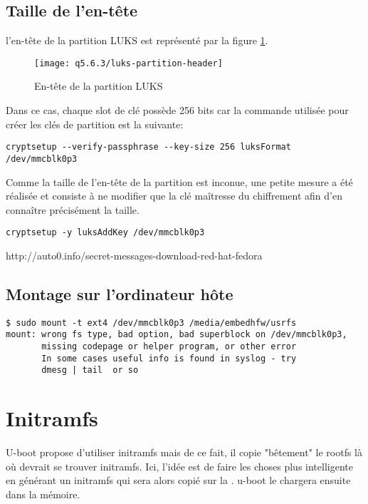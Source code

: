 \subsection{Taille de l'en-tête}
l'en-tête de la partition LUKS est représenté par la figure \ref{fig:luks partition header}.
\begin{figure}
	\centering
	\texttt{[image: q5.6.3/luks-partition-header]}
	\caption{\label{fig:luks partition header}En-tête de la partition LUKS}
\end{figure}
Dans ce cas, chaque slot de clé possède 256 bits car la commande utilisée pour créer les clés de partition est la suivante:
\begin{lstlisting}
cryptsetup --verify-passphrase --key-size 256 luksFormat /dev/mmcblk0p3
\end{lstlisting}

Comme la taille de l'en-tête de la partition est inconue, une petite mesure a été réalisée et consiste à ne modifier que la clé maîtresse du chiffrement afin d'en connaître précisément la taille.
\begin{lstlisting}
cryptsetup -y luksAddKey /dev/mmcblk0p3
\end{lstlisting}
http://auto0.info/secret-messages-download-red-hat-fedora

\subsection{Montage sur l'ordinateur hôte}
\begin{lstlisting}
$ sudo mount -t ext4 /dev/mmcblk0p3 /media/embedhfw/usrfs
mount: wrong fs type, bad option, bad superblock on /dev/mmcblk0p3,
       missing codepage or helper program, or other error
       In some cases useful info is found in syslog - try
       dmesg | tail  or so

\end{lstlisting}

\section{Initramfs}
U-boot propose d'utiliser initramfs mais de ce fait, il copie "bêtement" le rootfs là où devrait se trouver initramfs. Ici, l'idée est de faire les choses plus intelligente en générant un initramfs qui sera alors copié sur la \usd. u-boot le chargera ensuite dans la mémoire.

\href{http://forum.odroid.com/viewtopic.php?f=81&t=4860}{}

